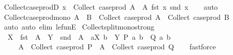 \begin{isabellebody}
\ Collect{\isacharunderscore}{\kern0pt}case{\isacharunderscore}{\kern0pt}prodD{\isacharcolon}{\kern0pt}\ {\isachardoublequoteopen}x\ {\isasymin}\ Collect\ {\isacharparenleft}{\kern0pt}case{\isacharunderscore}{\kern0pt}prod\ A{\isacharparenright}{\kern0pt}\ {\isasymLongrightarrow}\ A\ {\isacharparenleft}{\kern0pt}fst\ x{\isacharparenright}{\kern0pt}\ {\isacharparenleft}{\kern0pt}snd\ x{\isacharparenright}{\kern0pt}{\isachardoublequoteclose}\isanewline
%
\isadelimproof
\ \ %
\endisadelimproof
%
\isatagproof
{}\isamarkupfalse%
\ auto%
\endisatagproof
{\isafoldproof}%
%
\isadelimproof
\isanewline
%
\endisadelimproof
\isanewline
{}\isamarkupfalse%
\ Collect{\isacharunderscore}{\kern0pt}case{\isacharunderscore}{\kern0pt}prod{\isacharunderscore}{\kern0pt}mono{\isacharcolon}{\kern0pt}\ {\isachardoublequoteopen}A\ {\isasymle}\ B\ {\isasymLongrightarrow}\ Collect\ {\isacharparenleft}{\kern0pt}case{\isacharunderscore}{\kern0pt}prod\ A{\isacharparenright}{\kern0pt}\ {\isasymsubseteq}\ Collect\ {\isacharparenleft}{\kern0pt}case{\isacharunderscore}{\kern0pt}prod\ B{\isacharparenright}{\kern0pt}{\isachardoublequoteclose}\isanewline
%
\isadelimproof
\ \ %
\endisadelimproof
%
\isatagproof
{}\isamarkupfalse%
\ auto\ {\isacharparenleft}{\kern0pt}auto\ elim{\isacharbang}{\kern0pt}{\isacharcolon}{\kern0pt}\ le{\isacharunderscore}{\kern0pt}funE{\isacharparenright}{\kern0pt}%
\endisatagproof
{\isafoldproof}%
%
\isadelimproof
\isanewline
%
\endisadelimproof
\isanewline
{}\isamarkupfalse%
\ Collect{\isacharunderscore}{\kern0pt}split{\isacharunderscore}{\kern0pt}mono{\isacharunderscore}{\kern0pt}strong{\isacharcolon}{\kern0pt}\isanewline
\ \ {\isachardoublequoteopen}X\ {\isacharequal}{\kern0pt}\ fst\ {\isacharbackquote}{\kern0pt}\ A\ {\isasymLongrightarrow}\ Y\ {\isacharequal}{\kern0pt}\ snd\ {\isacharbackquote}{\kern0pt}\ A\ {\isasymLongrightarrow}\ {\isasymforall}a{\isasymin}X{\isachardot}{\kern0pt}\ {\isasymforall}b\ {\isasymin}\ Y{\isachardot}{\kern0pt}\ P\ a\ b\ {\isasymlongrightarrow}\ Q\ a\ b\isanewline
\ \ \ \ {\isasymLongrightarrow}\ A\ {\isasymsubseteq}\ Collect\ {\isacharparenleft}{\kern0pt}case{\isacharunderscore}{\kern0pt}prod\ P{\isacharparenright}{\kern0pt}\ {\isasymLongrightarrow}\ A\ {\isasymsubseteq}\ Collect\ {\isacharparenleft}{\kern0pt}case{\isacharunderscore}{\kern0pt}prod\ Q{\isacharparenright}{\kern0pt}{\isachardoublequoteclose}\isanewline
%
\isadelimproof
\ \ %
\endisadelimproof
%
\isatagproof
{}\isamarkupfalse%
\ fastforce%
\endisatagproof
{\isafoldproof}%
%
\isadelimproof
\isanewline

\end{isabellebody}
